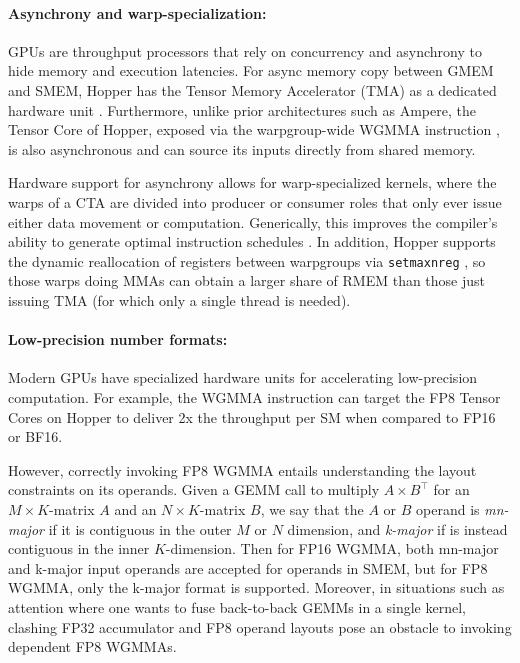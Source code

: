 \paragraph{Asynchrony and warp-specialization:}

GPUs are throughput processors that rely on concurrency and asynchrony to hide memory and execution latencies. For async memory copy between GMEM and SMEM, Hopper has the Tensor Memory Accelerator (TMA) as a dedicated hardware unit \cite[\S7.29]{cuda}.
Furthermore, unlike prior architectures such as Ampere, the Tensor Core of Hopper, exposed via the warpgroup-wide WGMMA instruction \cite[\S9.7.14]{ptx}, is also asynchronous and can source its inputs directly from shared memory.

Hardware support for asynchrony allows for warp-specialized kernels, where the warps of a CTA are divided into producer or consumer roles that only ever issue either data movement or computation. Generically, this improves the compiler's ability to generate optimal instruction schedules \citep{warp-specialization-2011}. In addition, Hopper supports the dynamic reallocation of registers between warpgroups via \verb|setmaxnreg| \cite[\S9.7.17.1]{ptx}, so those warps doing MMAs can obtain a larger share of RMEM than those just issuing TMA (for which only a single thread is needed).

\paragraph{Low-precision number formats:}
\label{sec:low-precision-gpu}
Modern GPUs have specialized hardware units for accelerating low-precision computation. For example, the WGMMA instruction can target the FP8 Tensor Cores on Hopper to deliver 2x the throughput per SM when compared to FP16 or BF16.

However, correctly invoking FP8 WGMMA entails understanding the layout constraints on its operands. Given a GEMM call to multiply $A \times B^{\top}$ for an $M\times K$-matrix $A$ and an $N\times K$-matrix $B$, we say that the $A$ or $B$ operand is \emph{mn-major} if it is contiguous in the outer $M$ or $N$ dimension, and \emph{k-major} if is instead contiguous in the inner $K$-dimension. Then for FP16 WGMMA, both mn-major and k-major input operands are accepted for operands in SMEM, but for FP8 WGMMA, only the k-major format is supported. Moreover, in situations such as attention where one wants to fuse back-to-back GEMMs in a single kernel, clashing FP32 accumulator and FP8 operand layouts pose an obstacle to invoking dependent FP8 WGMMAs.


